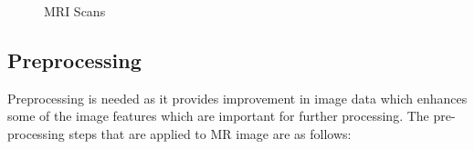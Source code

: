 \documentclass[11pt]{article}
\begin{document}
	\begin{figure}[H]
		\centering
		\hspace{0.5cm}
		\caption{MRI Scans}
		\label{MRIScans}
	\end{figure}

	\subsection{Preprocessing}%
	\label{sub:Preprocessing}

	Preprocessing is needed as it provides improvement
	in image data which  enhances some of the image features which are important
	for further processing. The  pre-processing steps that are applied to MR
	image are as follows:
\end{document}
